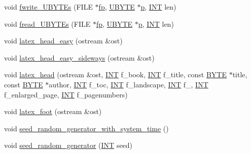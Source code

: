 \begin{DoxyCompactItemize}
void \mbox{\hyperlink{util_8_c_a3097dee262bebe614d11c8fc47e414d3}{fwrite\+\_\+\+U\+B\+Y\+T\+Es}} (F\+I\+LE $\ast$\mbox{\hyperlink{k__arc__lifting_8_c_a67cc9fbd0817c2d140368e5ed1f2a44d}{fp}}, \mbox{\hyperlink{galois_8h_a122c4acf389c050379f00341fdcd5812}{U\+B\+Y\+TE}} $\ast$\mbox{\hyperlink{alphabet2_8_c_a533391314665d6bf1b5575e9a9cd8552}{p}}, \mbox{\hyperlink{galois_8h_a09fddde158a3a20bd2dcadb609de11dc}{I\+NT}} len)
\item 
void \mbox{\hyperlink{util_8_c_ae19b6716e6272928adcd469b05632bdb}{fread\+\_\+\+U\+B\+Y\+T\+Es}} (F\+I\+LE $\ast$\mbox{\hyperlink{k__arc__lifting_8_c_a67cc9fbd0817c2d140368e5ed1f2a44d}{fp}}, \mbox{\hyperlink{galois_8h_a122c4acf389c050379f00341fdcd5812}{U\+B\+Y\+TE}} $\ast$\mbox{\hyperlink{alphabet2_8_c_a533391314665d6bf1b5575e9a9cd8552}{p}}, \mbox{\hyperlink{galois_8h_a09fddde158a3a20bd2dcadb609de11dc}{I\+NT}} len)
\item 
void \mbox{\hyperlink{util_8_c_af113b244ad72251e782a33c429b6fd12}{latex\+\_\+head\+\_\+easy}} (ostream \&ost)
\item 
void \mbox{\hyperlink{util_8_c_a4b10b4e3009dca099a0f486ccb76eb82}{latex\+\_\+head\+\_\+easy\+\_\+sideways}} (ostream \&ost)
\item 
void \mbox{\hyperlink{util_8_c_aa79495b18ba80fbf7271b8831cdc4058}{latex\+\_\+head}} (ostream \&ost, \mbox{\hyperlink{galois_8h_a09fddde158a3a20bd2dcadb609de11dc}{I\+NT}} f\+\_\+book, \mbox{\hyperlink{galois_8h_a09fddde158a3a20bd2dcadb609de11dc}{I\+NT}} f\+\_\+title, const \mbox{\hyperlink{galois_8h_ab6cc7b4aeb6ea31aba2b3fbfc83ff5e6}{B\+Y\+TE}} $\ast$title, const \mbox{\hyperlink{galois_8h_ab6cc7b4aeb6ea31aba2b3fbfc83ff5e6}{B\+Y\+TE}} $\ast$author, \mbox{\hyperlink{galois_8h_a09fddde158a3a20bd2dcadb609de11dc}{I\+NT}} f\+\_\+toc, \mbox{\hyperlink{galois_8h_a09fddde158a3a20bd2dcadb609de11dc}{I\+NT}} f\+\_\+landscape, \mbox{\hyperlink{galois_8h_a09fddde158a3a20bd2dcadb609de11dc}{I\+NT}} f\+\_\+12pt, \mbox{\hyperlink{galois_8h_a09fddde158a3a20bd2dcadb609de11dc}{I\+NT}} f\+\_\+enlarged\+\_\+page, \mbox{\hyperlink{galois_8h_a09fddde158a3a20bd2dcadb609de11dc}{I\+NT}} f\+\_\+pagenumbers)
\item 
void \mbox{\hyperlink{util_8_c_a409d1f292c1fefb519b8a4894f022714}{latex\+\_\+foot}} (ostream \&ost)
\item 
void \mbox{\hyperlink{util_8_c_a564b2bcc7789f70794b0df0888ae65bf}{seed\+\_\+random\+\_\+generator\+\_\+with\+\_\+system\+\_\+time}} ()
\item 
void \mbox{\hyperlink{util_8_c_a4a73fe7c1b8801c8a2cf489ee793f06a}{seed\+\_\+random\+\_\+generator}} (\mbox{\hyperlink{galois_8h_a09fddde158a3a20bd2dcadb609de11dc}{I\+NT}} seed)

\end{DoxyCompactItemize}
